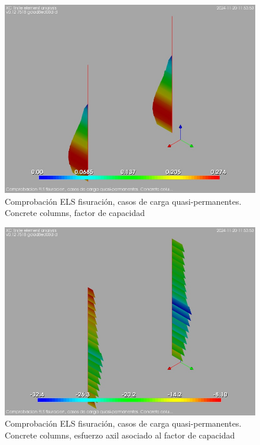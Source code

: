 \begin{figure}[ht]
\begin{center}
\includegraphics[width=\linewidth]{results/graphics/crackingSLS_qperm/columnZconcrCF}
\caption{Comprobación ELS fisuración, casos de carga quasi-permanentes. Concrete columns, factor de capacidad}
\label{SLS_quasiPermanentLoadsCrackControlcolumnZconcrCF}
\end{center}
\end{figure}
\begin{figure}[ht]
\begin{center}
\includegraphics[width=\linewidth]{results/graphics/crackingSLS_qperm/columnZconcrN}
\caption{Comprobación ELS fisuración, casos de carga quasi-permanentes. Concrete columns, esfuerzo axil asociado al factor de capacidad}
\label{SLS_quasiPermanentLoadsCrackControlcolumnZconcrN}
\end{center}
\end{figure}
